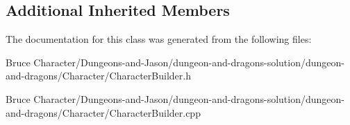 \subsection*{Additional Inherited Members}


The documentation for this class was generated from the following files\+:\begin{DoxyCompactItemize}
\item 
Bruce Character/\+Dungeons-\/and-\/\+Jason/dungeon-\/and-\/dragons-\/solution/dungeon-\/and-\/dragons/\+Character/Character\+Builder.\+h\item 
Bruce Character/\+Dungeons-\/and-\/\+Jason/dungeon-\/and-\/dragons-\/solution/dungeon-\/and-\/dragons/\+Character/Character\+Builder.\+cpp\end{DoxyCompactItemize}
